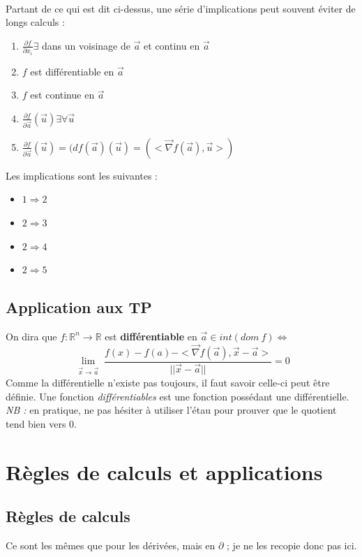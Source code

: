 \documentclass[11pt, a4paper, openany]{book}
\begin{document}
\ \\

Partant de ce qui est dit ci-dessus, une série d'implications peut souvent éviter de longs calculs : 
\begin{enumerate}
	\item $\frac{\partial f}{\partial x_i} \exists$ dans un voisinage de $\vec{a}$ et continu en $\vec{a}$
	\item $f$ est différentiable en $\vec{a}$
	\item $f$ est continue en $\vec{a}$
	\item $\frac{\partial f}{\partial \vec{a}}(\vec{u}) \exists \forall \vec{u}$
	\item $\frac{\partial f}{\partial \vec{a}}(\vec{u}) = (df(\vec{a})(\vec{u}) = (<\vec{\nabla}f(\vec{a}), \vec{u}>)$
\end{enumerate}
Les implications sont les suivantes : 
\begin{itemize}
	\item $1 \Rightarrow 2$
	\item $2 \Rightarrow 3$
	\item $2 \Rightarrow 4$
	\item $2 \Rightarrow 5$
\end{itemize}

\subsection*{Application aux TP}
On dira que $f : \mathbb{R}^n \rightarrow \mathbb{R}$ est \textbf{différentiable} en $\vec{a} \in int(dom\ f) \Leftrightarrow$
$$\lim\limits_{\substack{\vec{x} \to \vec{a}}} \frac{f(x) - f(a) - <\vec{\nabla}f(\vec{a}), \vec{x} - \vec{a}>}{||\vec{x} - \vec{a}||} = 0$$
Comme la différentielle n'existe pas toujours, il faut savoir celle-ci peut être définie. Une fonction \textit{différentiables} est une fonction possédant une différentielle.\\

\textit{NB :} en pratique, ne pas hésiter à utiliser l'étau pour prouver que le quotient tend bien vers 0.


\section{Règles de calculs et applications}
\subsection{Règles de calculs}
Ce sont les mêmes que pour les dérivées, mais en $\partial$ ; je ne les recopie donc pas ici.
\end{document}
